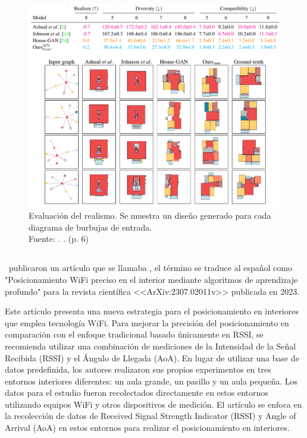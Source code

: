 \begin{figure}[!ht]
	\begin{center}
		\includegraphics[width=1.1\textwidth]{2/figures/nauata2021_2.png}
		\caption[Evaluación del realismo. Se muestra un diseño generado para cada diagrama de burbujas de entrada]{Evaluación del realismo. Se muestra un diseño generado para cada diagrama de burbujas de entrada.\\
			Fuente: \cite{pr_nauata2021housegan}. . (p. 6)}
		\label{2:fig116}
	\end{center}
\end{figure}

\subsection{}
\cite{pr_cai2023precisewifi} publicaron un artículo que se llamaba , el término se traduce al español como "Posicionamiento WiFi preciso en el interior mediante algoritmos de aprendizaje profundo" para la revista científica <<ArXiv:2307.02011v>> publicada en 2023.

Este artículo presenta una nueva estrategia para el posicionamiento en interiores que emplea tecnología WiFi. Para mejorar la precisión del posicionamiento en comparación con el enfoque tradicional basado únicamente en RSSI, se recomienda utilizar una combinación de mediciones de la Intensidad de la Señal Recibida (RSSI) y el Ángulo de Llegada (AoA). En lugar de utilizar una base de datos predefinida, los autores realizaron sus propios experimentos en tres entornos interiores diferentes: un aula grande, un pasillo y un aula pequeña. Los datos para el estudio fueron recolectados directamente en estos entornos utilizando equipos WiFi y otros dispositivos de medición. El artículo se enfoca en la recolección de datos de Received Signal Strength Indicator (RSSI) y Angle of Arrival (AoA) en estos entornos para realizar el posicionamiento en interiores.

